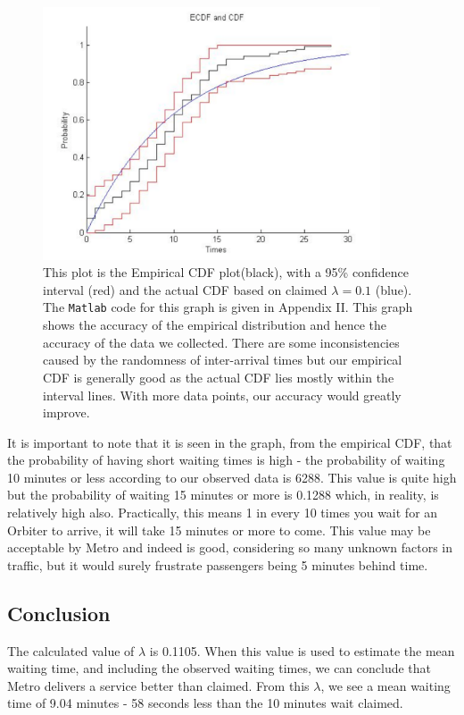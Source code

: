 \begin{figure}
 \begin{center}
\includegraphics[width=10cm]{figures/OrbiterBus_Ecdf_Cdf.pdf}
\caption{This plot is the Empirical CDF plot(black), with a 95\% confidence interval (red) and the actual CDF based on claimed $\lambda=0.1$ (blue). The {\tt Matlab} code for this graph is given in Appendix II. This graph shows the accuracy of the empirical distribution and hence the accuracy of the data we collected. There are some inconsistencies caused by the randomness of inter-arrival times but our empirical CDF is generally good as the actual CDF lies mostly within the interval lines. With more data points, our accuracy would greatly improve.}
\end{center}
\end{figure}

It is important to note that it is seen in the graph, from the empirical CDF, that the probability of having short waiting times is high - the probability of waiting 10 minutes or less according to our observed data is 6288. This value is quite high but the probability of waiting 15 minutes or more is 0.1288 which, in reality, is relatively high also. Practically, this means 1 in every 10 times you wait for an Orbiter to arrive, it will take 15 minutes or more to come. This value may be acceptable by Metro and indeed is good, considering so many unknown factors in traffic, but it would surely frustrate passengers being 5 minutes behind time. 

\subsection{Conclusion}
The calculated value of $\lambda$ is 0.1105. When this value is used to estimate the mean waiting time, and including the observed waiting times, we can conclude that Metro delivers a service better than claimed. From this $\lambda$, we see a mean waiting time of 9.04 minutes - 58 seconds less than the 10 minutes wait claimed.

